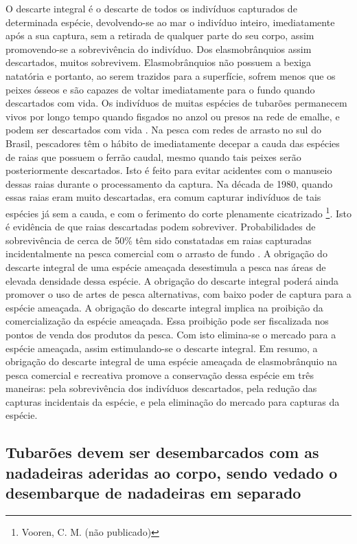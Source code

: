 \documentclass[a4paper,11pt,twoside,showtrims,onecolumn,openright,final]{memoir}
\begin{document}
O descarte integral é o descarte de todos os indivíduos capturados de determinada espécie, 
devolvendo-se ao mar o indivíduo inteiro, imediatamente após a sua captura,  sem a retirada de 
qualquer parte do seu corpo, assim promovendo-se a sobrevivência do indivíduo. 
Dos elasmobrânquios assim descartados, muitos sobrevivem. Elasmobrânquios não possuem a 
bexiga natatória e portanto, ao serem trazidos para a superfície, sofrem menos que os peixes ósseos 
e são capazes de voltar imediatamente para o fundo quando descartados com vida. 
Os indivíduos de muitas espécies de tubarões permanecem vivos por longo tempo quando fisgados 
no anzol ou presos na rede de emalhe, e podem ser descartados com vida \citep{stone1998}. %
Na pesca com redes de arrasto no sul do Brasil, pescadores têm o hábito de imediatamente decepar 
a cauda das espécies de raias que possuem o ferrão caudal, mesmo quando tais peixes serão 
posteriormente descartados. Isto é feito para evitar acidentes com o manuseio dessas raias durante 
o processamento da captura. Na década de 1980, quando essas raias eram muito descartadas, era comum 
capturar indivíduos de tais espécies já sem a cauda, e com o ferimento do corte plenamente 
cicatrizado \footnote{Vooren, C. M. (não publicado)}. 
Isto é evidência de que raias descartadas podem sobreviver. Probabilidades de sobrevivência 
de cerca de 50\% têm sido constatadas em raias capturadas incidentalmente na pesca 
comercial com o arrasto de fundo \citep{laptikhovsky2004}. %
A obrigação do descarte integral de uma espécie ameaçada desestimula a pesca nas 
áreas de elevada densidade dessa espécie. A obrigação do descarte integral poderá ainda promover 
o uso de artes de pesca alternativas, com baixo poder de captura para a espécie ameaçada. A obrigação 
do descarte integral implica na proibição da comercialização da espécie ameaçada. Essa proibição 
pode ser fiscalizada nos pontos de venda dos produtos da pesca. Com isto elimina-se o mercado para 
a espécie ameaçada,  assim estimulando-se  o descarte integral.  Em resumo, a obrigação do descarte 
integral de uma espécie ameaçada de elasmobrânquio na pesca comercial e recreativa promove a conservação 
dessa espécie em três maneiras: pela sobrevivência dos indivíduos descartados, pela redução das capturas 
incidentais da espécie, e pela eliminação do mercado para capturas da espécie.

\subsection*{Tubarões devem ser desembarcados com as nadadeiras aderidas ao corpo, sendo vedado 
             o desembarque de nadadeiras em separado}
\end{document}
